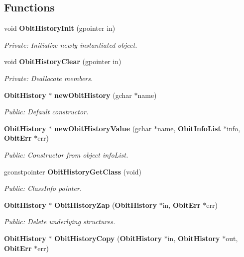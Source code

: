 \subsection*{Functions}
\begin{CompactItemize}
\item 
void {\bf Obit\-History\-Init} (gpointer in)
\begin{CompactList}\small\item\em Private: Initialize newly instantiated object. \item\end{CompactList}\item 
void {\bf Obit\-History\-Clear} (gpointer in)
\begin{CompactList}\small\item\em Private: Deallocate members. \item\end{CompactList}\item 
{\bf Obit\-History} $\ast$ {\bf new\-Obit\-History} (gchar $\ast$name)
\begin{CompactList}\small\item\em Public: Default constructor. \item\end{CompactList}\item 
{\bf Obit\-History} $\ast$ {\bf new\-Obit\-History\-Value} (gchar $\ast$name, {\bf Obit\-Info\-List} $\ast$info, {\bf Obit\-Err} $\ast$err)
\begin{CompactList}\small\item\em Public: Constructor from object info\-List. \item\end{CompactList}\item 
gconstpointer {\bf Obit\-History\-Get\-Class} (void)
\begin{CompactList}\small\item\em Public: Class\-Info pointer. \item\end{CompactList}\item 
{\bf Obit\-History} $\ast$ {\bf Obit\-History\-Zap} ({\bf Obit\-History} $\ast$in, {\bf Obit\-Err} $\ast$err)
\begin{CompactList}\small\item\em Public: Delete underlying structures. \item\end{CompactList}\item 
{\bf Obit\-History} $\ast$ {\bf Obit\-History\-Copy} ({\bf Obit\-History} $\ast$in, {\bf Obit\-History} $\ast$out, {\bf Obit\-Err} $\ast$err)

\end{CompactItemize}
